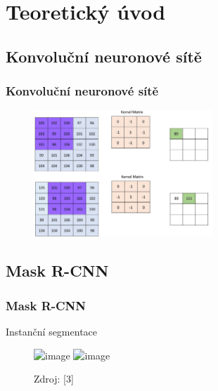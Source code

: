 \documentclass{beamer}
\begin{document}

\section{Teoretický úvod}

\subsection{Konvoluční neuronové sítě} %


\begin{frame}

\frametitle{Konvoluční neuronové sítě}

\begin{figure}[ht]
	\includegraphics[width=0.6\textwidth]{pictures/conv.jpg}
\end{figure}


\end{frame}


\subsection{Mask R-CNN}

\begin{frame}

\frametitle{Mask R-CNN}

Instanční segmentace

\begin{figure}[ht]
	\includegraphics<1>[width=0.9\textwidth]{pictures/segmentations.png}
	\includegraphics<2>[width=0.65\textwidth]{pictures/instance-segmentation.png}
	\caption{Zdroj: [3]}
\end{figure}

\end{frame}
\end{document}
